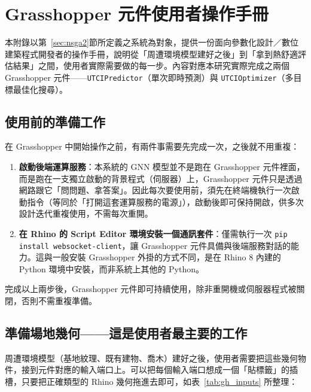 \section{Grasshopper 元件使用者操作手冊}
\label{appx:user_manual}

本附錄以第~\ref{sec:nsga2}節所定義之系統為對象，提供一份面向參數化設計／數位建築程式開發者的操作手冊，說明從「周遭環境模型建好之後」到「拿到熱舒適評估結果」之間，使用者實際需要做的每一步。內容對應本研究實際完成之兩個 Grasshopper 元件——\texttt{UTCIPredictor}（單次即時預測）與 \texttt{UTCIOptimizer}（多目標最佳化搜尋）。

\subsection{使用前的準備工作}
\label{appx:user_manual_prep}

在 Grasshopper 中開始操作之前，有兩件事需要先完成一次，之後就不用重複：

\begin{enumerate}
    \item \textbf{啟動後端運算服務}：本系統的 GNN 模型並不是跑在 Grasshopper 元件裡面，而是跑在一支獨立啟動的背景程式（伺服器）上，Grasshopper 元件只是透過網路跟它「問問題、拿答案」。因此每次要使用前，須先在終端機執行一次啟動指令（等同於「打開這套運算服務的電源」），啟動後即可保持開啟，供多次設計迭代重複使用，不需每次重開。
    \item \textbf{在 Rhino 的 Script Editor 環境安裝一個通訊套件}：僅需執行一次 \texttt{pip install websocket-client}，讓 Grasshopper 元件具備與後端服務對話的能力。這與一般安裝 Grasshopper 外掛的方式不同，是在 Rhino 8 內建的 Python 環境中安裝，而非系統上其他的 Python。
\end{enumerate}

完成以上兩步後，Grasshopper 元件即可持續使用，除非重開機或伺服器程式被關閉，否則不需重複準備。

\subsection{準備場地幾何——這是使用者最主要的工作}
\label{appx:user_manual_geometry}

周遭環境模型（基地紋理、既有建物、喬木）建好之後，使用者需要把這些幾何物件，接到元件對應的輸入端口上。可以把每個輸入端口想成一個「貼標籤」的插槽，只要把正確類型的 Rhino 幾何拖進去即可，如表~\ref{tab:gh_inputs} 所整理：

